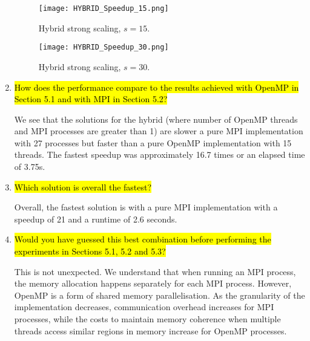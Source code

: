\documentclass{article}
\begin{document}
\begin{enumerate}
		\begin{figure}[p] %
	 	\begin{center}
	 		\texttt{[image: HYBRID\_Speedup\_15.png]} %
	 		\caption{Hybrid strong scaling, $s=15$.}
	 		\label{fig:hybrid_strongscaling_s15}
	 	\end{center}
	\end{figure}
		
	\begin{figure}[p] %
	 	\begin{center}
	 		\texttt{[image: HYBRID\_Speedup\_30.png]} %
	 		\caption{Hybrid strong scaling, $s=30$.}
	 		\label{fig:hybrid_strongscaling_s30}
	 	\end{center}
	\end{figure}
	
	\item \hl{How does the performance compare to the results achieved with OpenMP in Section 5.1 and with MPI in Section 5.2?}

	We see that the solutions for the hybrid (where number of OpenMP threads and MPI processes are greater than 1) are slower a pure MPI implementation with 27 processes but faster than a pure OpenMP implementation with 15 threads. The fastest speedup was approximately 16.7 times or an elapsed time of 3.75s. 
	
	\item \hl{Which solution is overall the fastest?}

	Overall, the fastest solution is with a pure MPI implementation with a speedup of 21 and a runtime of 2.6 seconds.
	
	\item \hl{Would you have guessed this best combination before performing the experiments in Sections 5.1, 5.2 and 5.3?}

	This is not unexpected. We understand that when running an MPI process, the memory allocation happens separately for each MPI process. However, OpenMP is a form of shared memory parallelisation. As the granularity of the implementation decreases, communication overhead increases for MPI processes, while the costs to maintain memory coherence when multiple threads access similar regions in memory increase for OpenMP processes.
\end{enumerate}
\end{document}
